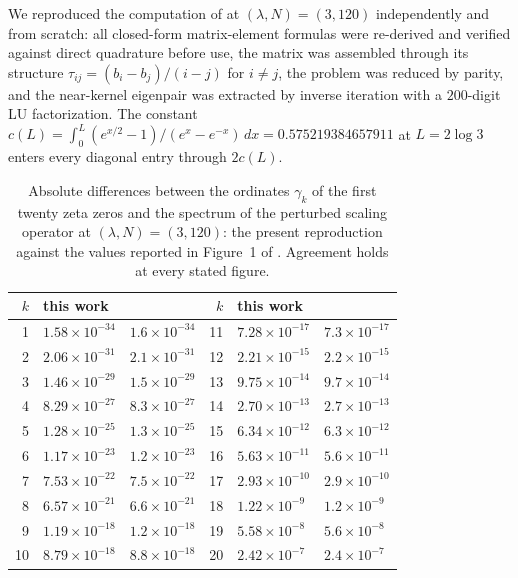\documentclass[11pt,oneside]{article}
\theoremstyle{remark}
\begin{document}
We reproduced the computation of \cite{CCM} at $(\lambda, N) = (3, 120)$
independently and from scratch: all closed-form matrix-element formulas were
re-derived and verified against direct quadrature before use, the matrix was
assembled through its structure
$\tau_{ij} = (b_i - b_j)/(i-j)$ for $i \ne j$, the problem was reduced by
parity, and the near-kernel eigenpair was extracted by inverse iteration with a
$200$-digit LU factorization. The constant
$c(L) = \int_0^L (e^{x/2}-1)/(e^x - e^{-x})\,dx = 0.575219384657911$ at
$L = 2\log 3$ enters every diagonal entry through $2c(L)$.

\begin{table}[ht]
\centering
\begin{tabular}{rll@{\qquad}rll}
\toprule
$k$ & this work & \cite{CCM} & $k$ & this work & \cite{CCM} \\
\midrule
1 & $1.58\times10^{-34}$ & $1.6\times10^{-34}$ & 11 & $7.28\times10^{-17}$ & $7.3\times10^{-17}$ \\
2 & $2.06\times10^{-31}$ & $2.1\times10^{-31}$ & 12 & $2.21\times10^{-15}$ & $2.2\times10^{-15}$ \\
3 & $1.46\times10^{-29}$ & $1.5\times10^{-29}$ & 13 & $9.75\times10^{-14}$ & $9.7\times10^{-14}$ \\
4 & $8.29\times10^{-27}$ & $8.3\times10^{-27}$ & 14 & $2.70\times10^{-13}$ & $2.7\times10^{-13}$ \\
5 & $1.28\times10^{-25}$ & $1.3\times10^{-25}$ & 15 & $6.34\times10^{-12}$ & $6.3\times10^{-12}$ \\
6 & $1.17\times10^{-23}$ & $1.2\times10^{-23}$ & 16 & $5.63\times10^{-11}$ & $5.6\times10^{-11}$ \\
7 & $7.53\times10^{-22}$ & $7.5\times10^{-22}$ & 17 & $2.93\times10^{-10}$ & $2.9\times10^{-10}$ \\
8 & $6.57\times10^{-21}$ & $6.6\times10^{-21}$ & 18 & $1.22\times10^{-9}$  & $1.2\times10^{-9}$ \\
9 & $1.19\times10^{-18}$ & $1.2\times10^{-18}$ & 19 & $5.58\times10^{-8}$  & $5.6\times10^{-8}$ \\
10 & $8.79\times10^{-18}$ & $8.8\times10^{-18}$ & 20 & $2.42\times10^{-7}$  & $2.4\times10^{-7}$ \\
\bottomrule
\end{tabular}
\caption{Absolute differences between the ordinates $\gamma_k$ of the first
twenty zeta zeros and the spectrum of the perturbed scaling operator at
$(\lambda, N) = (3, 120)$: the present reproduction against the values reported
in Figure~1 of \cite{CCM}. Agreement holds at every stated figure.}
\label{tab:ccm}
\end{table}
\end{document}
